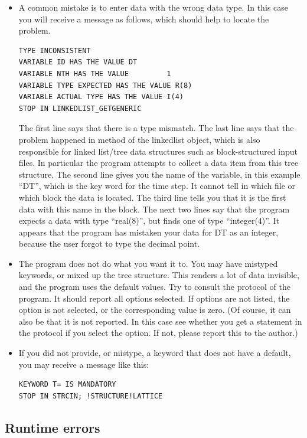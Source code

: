 \documentclass[final,12pt,makeidx,DIV=calc]{article}
\begin{document}
{{{{{{\begin{itemize}
\item A common mistake is to enter data with the wrong data type.
  In this case you will receive a message as follows, which should help
  to locate the problem.
\begin{verbatim}
TYPE INCONSISTENT
VARIABLE ID HAS THE VALUE DT
VARIABLE NTH HAS THE VALUE         1
VARIABLE TYPE EXPECTED HAS THE VALUE R(8)
VARIABLE ACTUAL TYPE HAS THE VALUE I(4)
STOP IN LINKEDLIST_GETGENERIC
\end{verbatim}
The first line says that there is a type mismatch. The last line
says that the problem happened in method of the linkedlist object,
which is also responsible for linked list/tree data structures such as
block-structured input files. In particular the program attempts to
collect a data item from this tree structure.  The second line gives
you the name of the variable, in this example ``DT'', which is the key
word for the time step. It cannot tell in which file or which block
the data is located. The third line tells you that it is the first
data with this name in the block. The next two lines say that the
program expects a data with type ``real(8)'', but finds one of type
``integer(4)''. It appears that the program has mistaken your data for
DT as an integer, because the user forgot to type the decimal point.
\item The program does not do what you want it to. You may have mistyped
  keywords, or mixed up the tree structure. This renders a lot of data
  invisible, and the program uses the default values. Try to consult
  the protocol of the program. It should report all options selected.
  If options are not listed, the option is not selected, or the
  corresponding value is zero. (Of course, it can also be that it is
  not reported. In this case see whether you get a statement in the
  protocol if you select the option. If not, please report this to the
  author.)
\item If you did not provide, or mistype, a keyword that does not have
  a default, you may receive a message like this:
\begin{verbatim}
KEYWORD T= IS MANDATORY
STOP IN STRCIN; !STRUCTURE!LATTICE
\end{verbatim}

\end{itemize}



\subsection{Runtime errors}

}}}}}}
\end{document}
